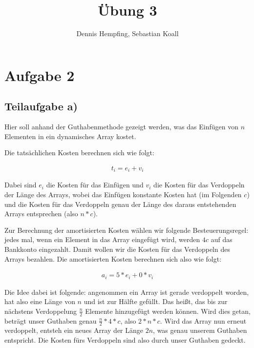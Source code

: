 \documentclass[12pt]{scrartcl}%
\theoremstyle{nonumberplain}
\begin{document}
\author{Dennis Hempfing, Sebastian Koall}
\title{Übung 3}
\date{} 
\pagestyle{myheadings}

\maketitle %

\section*{Aufgabe 2}

\subsection*{Teilaufgabe a)}

Hier soll anhand der Guthabenmethode gezeigt werden, was das Einfügen von $n$ Elementen in ein dynamisches Array kostet.

Die tatsächlichen Kosten berechnen sich wie folgt:

\begin{align*}
	t_i = e_i + v_i
\end{align*}

Dabei sind $e_i$ die Kosten für das Einfügen und $v_i$ die Kosten für das Verdoppeln der Länge des Arrays, wobei das Einfügen konstante Kosten hat (im Folgenden $c$) und die Kosten für das Verdoppeln genau der Länge des daraus entstehenden Arrays entsprechen (also $n * c$).

Zur Berechnung der amortisierten Kosten wählen wir folgende Besteuerungsregel: jedes mal, wenn ein Element in das Array eingefügt wird, werden $4c$ auf das Bankkonto eingezahlt. Damit wollen wir die Kosten für das Verdoppeln des Arrays bezahlen. Die amortisierten Kosten berechnen sich also wie folgt:

\begin{align*}
a_i = 5*e_i + 0*v_i
\end{align*}

Die Idee dabei ist folgende: angenommen ein Array ist gerade verdoppelt worden, hat also eine Länge von $n$ und ist zur Hälfte gefüllt. Das heißt, das bis zur nächstens Verdoppelung $\frac{n}{2}$ Elemente hinzugefügt werden können. Wird dies getan, beträgt unser Guthaben genau $\frac{n}{2} * 4 * c$, also $2 * n * c$. Wird das Array nun erneut verdoppelt, entsteh ein neues Array der Länge $2n$, was genau unserem Guthaben entspricht. Die Kosten fürs Verdoppeln sind also durch unser Guthaben gedeckt.
\end{document}
